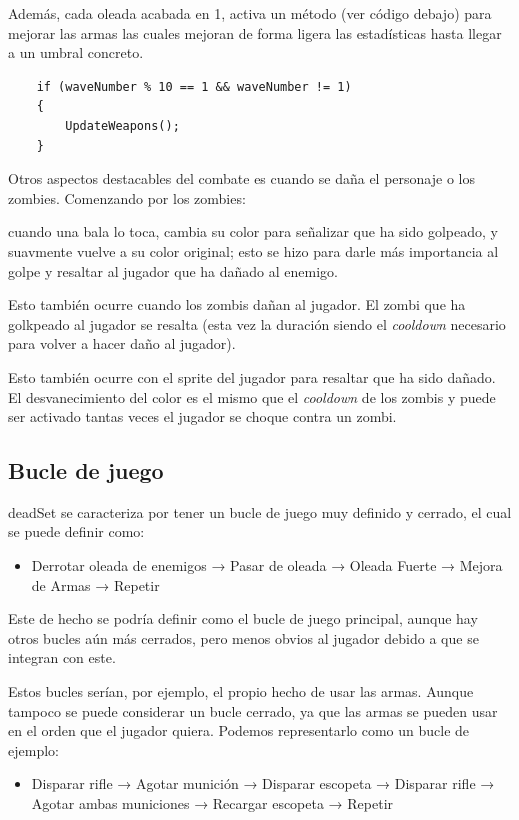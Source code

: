 \documentclass[12pt]{article}
\begin{document}
        
        Además, cada oleada acabada en 1, activa un método (ver código debajo) para mejorar las armas las cuales mejoran de forma ligera las estadísticas hasta llegar a un umbral concreto.
        
    \begin{verbatim}
    if (waveNumber % 10 == 1 && waveNumber != 1)
    {
        UpdateWeapons();
    }
    \end{verbatim}

    Otros aspectos destacables del combate es cuando se daña el personaje o los zombies. Comenzando por los zombies: 
    
    cuando una bala lo toca, cambia su color para señalizar que ha sido golpeado, y suavmente vuelve a su color original; esto se hizo para darle más importancia al golpe y resaltar al jugador que ha dañado al enemigo. 

    Esto también ocurre cuando los zombis dañan al jugador. El zombi que ha golkpeado al jugador se resalta (esta vez la duración siendo el \textit{cooldown} necesario para volver a hacer daño al jugador). 
    
    Esto también ocurre con el sprite del jugador para resaltar que ha sido dañado. El desvanecimiento del color es el mismo que el \textit{cooldown} de los zombis y puede ser activado tantas veces el jugador se choque contra un zombi.

        \subsection{Bucle de juego}
        \textunderscore deadSet se caracteriza por tener un bucle de juego muy definido y cerrado, el cual se puede definir como:
        
        \begin{itemize}
            \item Derrotar oleada de enemigos → Pasar de oleada → Oleada Fuerte → Mejora de Armas → Repetir
        \end{itemize}
        Este de hecho se podría definir como el bucle de juego principal, aunque hay otros bucles aún más cerrados, pero menos obvios al jugador debido a que se integran con este. 
        
        Estos bucles serían, por ejemplo, el propio hecho de usar las armas. Aunque tampoco se puede considerar un bucle cerrado, ya que las armas se pueden usar en el orden que el jugador quiera. Podemos representarlo como un bucle de ejemplo: 
        \begin{itemize}
            \item Disparar rifle → Agotar munición → Disparar escopeta → Disparar rifle → Agotar ambas municiones → Recargar escopeta → Repetir
        \end{itemize}
\end{document}
